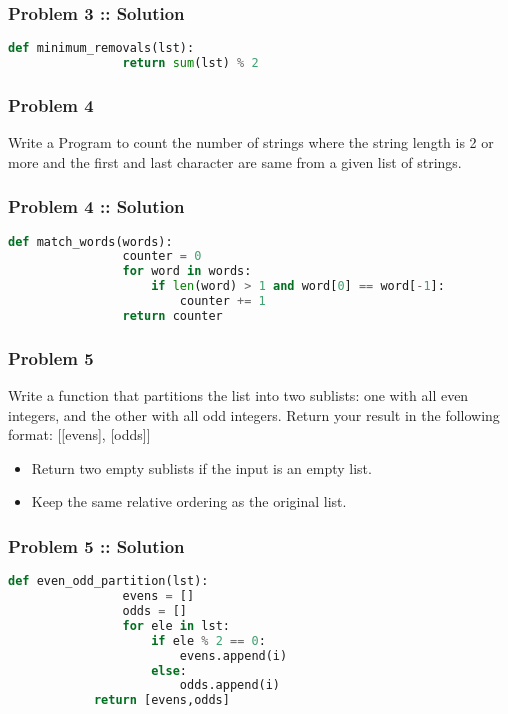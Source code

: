 \documentclass[14pt]{beamer}
\begin{document}
    \begin{frame}[containsverbatim]
        \frametitle{Problem 3 :: Solution}
        \begin{lstlisting}[language=Python]
            def minimum_removals(lst):
                return sum(lst) % 2
        \end{lstlisting}
    \end{frame}

    \begin{frame}
        \frametitle{Problem 4}
        \alert{Write a Program to count the number of strings where the string length is 2 or more and the first and last character are same from a given list of strings.}
    \end{frame}
    
    \begin{frame}[containsverbatim]
        \frametitle{Problem 4 :: Solution}
        \begin{lstlisting}[language=Python]
            def match_words(words):
                counter = 0
                for word in words:
                    if len(word) > 1 and word[0] == word[-1]:
                        counter += 1
                return counter
        \end{lstlisting}
    \end{frame}

    \begin{frame}
        \frametitle{Problem 5}
        \alert{Write a function that partitions the list into two sublists: one with all even integers, and the other with all odd integers. Return your result in the following format: [[evens], [odds]]}

        \begin{itemize}
            \item Return two empty sublists if the input is an empty list.
            \item Keep the same relative ordering as the original list.
        \end{itemize}
    \end{frame}

    \begin{frame}[containsverbatim]
        \frametitle{Problem 5 :: Solution}

        \begin{lstlisting}[language=Python]
            def even_odd_partition(lst):
                evens = []
                odds = []
                for ele in lst:
                    if ele % 2 == 0:
                        evens.append(i)
                    else:
                        odds.append(i)
            return [evens,odds]
        \end{lstlisting}
    \end{frame}
\end{document}
